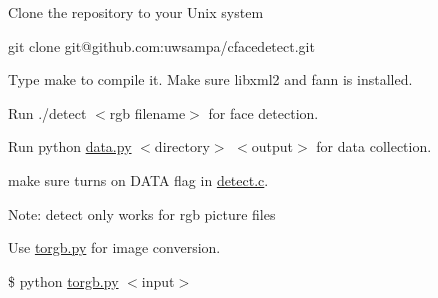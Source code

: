 
\begin{DoxyEnumerate}
\item Clone the repository to your Unix system
\begin{DoxyItemize}
\item {\ttfamily git clone git@github.\+com\+:uwsampa/cfacedetect.\+git}
\end{DoxyItemize}
\item Type {\ttfamily make} to compile it. Make sure libxml2 and fann is installed.
\item Run {\ttfamily ./detect $<$rgb filename$>$} for face detection.
\item Run {\ttfamily python \hyperlink{data_8py}{data.\+py} $<$directory$>$ $<$output$>$} for data collection.
\begin{DoxyItemize}
\item make sure turns on D\+A\+T\+A flag in \hyperlink{detect_8c}{detect.\+c}.
\end{DoxyItemize}
\end{DoxyEnumerate}

Note\+: detect only works for rgb picture files

Use \hyperlink{torgb_8py}{torgb.\+py} for image conversion.
\begin{DoxyItemize}
\item {\ttfamily \$ python \hyperlink{torgb_8py}{torgb.\+py} $<$input$>$} 
\end{DoxyItemize}